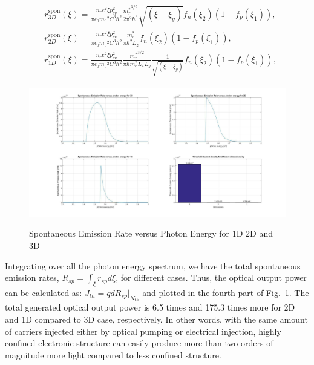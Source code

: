 \begin{eqnarray}
\begin{aligned}
& r_{3D}^{\mathrm{spon}}(\xi)=\frac{n_re^2\xi{p_{cv}^2}}{{\pi}\epsilon_0{m_0}^2C^3{\hbar^2}}\frac{{m_r^\ast}^{3/2}}{2\pi^2\hbar^3}{\sqrt{(\xi-\xi_g)}}f_n(\xi_2)(1-f_p(\xi_1)),
\\
& r_{2D}^{\mathrm{spon}}(\xi)=\frac{n_re^2\xi{p_{cv}^2}}{{\pi}\epsilon_0{m_0}^2C^3{\hbar^2}}\frac{{m_r^\ast}}{\pi\hbar^2L_z}f_n(\xi_2)(1-f_p(\xi_1)),
\\
& r_{1D}^{\mathrm{spon}}(\xi)=\frac{n_re^2\xi{p_{cv}^2}}{{\pi}\epsilon_0{m_0}^2C^3{\hbar^2}}\frac{{m_r^\ast}^{3/2}}{\pi\hbar{m_e^\ast}L_xL_y}\frac{1}{\sqrt{(\xi-\xi_g)}}f_n(\xi_2)(1-f_p(\xi_1)),
\end{aligned}
\label{eq:six}
\end{eqnarray}

\begin{figure}
  \caption{Spontaneous Emission Rate versus Photon Energy for 1D 2D and 3D}
  \centering
  \includegraphics[width=\textwidth]{pictures/LT/sponrate}
  \label{sponrate}
\end{figure}

Integrating over all the photon energy spectrum, we have the total spontaneous emission rates, $R_{sp} =
\int_{\xi}r_{sp}d{\xi}$, for different cases. Thus, the optical output power
can be calculated as: $J_{th}= qdR_{sp}|_{N_{th}}$ and
plotted in the fourth part of Fig.~\ref{sponrate}. The total generated optical output power is 6.5 times and 175.3 times more for 2D and 1D compared to 3D case, respectively. In other words, with the same amount of carriers injected either by optical pumping or electrical injection, highly confined electronic structure can easily produce more than two orders of magnitude more light compared to less confined structure.


